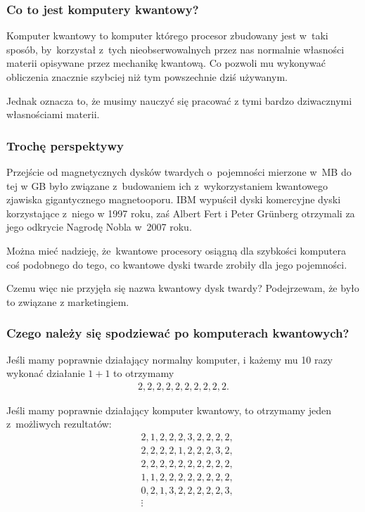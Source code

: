 \documentclass[10pt,t]{beamer}
\begin{document}
\begin{frame}
  \frametitle{Co to jest komputery kwantowy?}


  Komputer kwantowy to komputer którego procesor zbudowany jest w~taki
  sposób, by~korzystał z~tych nieobserwowalnych przez nas normalnie
  własności materii opisywane przez mechanikę kwantową. Co pozwoli mu
  wykonywać obliczenia znacznie szybciej niż tym powszechnie dziś
  używanym.

  Jednak oznacza to, że musimy nauczyć się pracować z tymi bardzo
  dziwacznymi własnościami materii.

\end{frame}





\begin{frame}
  \frametitle{Trochę perspektywy}


  Przejście od magnetycznych dysków twardych o~pojemności mierzone
  w~MB do tej w GB było związane z~budowaniem ich z~wykorzystaniem
  kwantowego zjawiska gigantycznego magnetooporu. IBM wypuścił dyski
  komercyjne dyski korzystające z~niego w 1997 roku, zaś Albert Fert i
  Peter Gr\"{u}nberg otrzymali za jego odkrycie Nagrodę Nobla w~2007
  roku.

  Można mieć nadzieję, że~kwantowe procesory osiągną dla szybkości
  komputera coś podobnego do tego, co kwantowe dyski twarde zrobiły
  dla jego pojemności.

  Czemu więc nie przyjęła się nazwa kwantowy dysk twardy? Podejrzewam,
  że było to związane z marketingiem.

\end{frame}





\begin{frame}
  \frametitle{Czego należy się spodziewać po komputerach kwantowych?}


  Jeśli mamy poprawnie działający normalny komputer, i każemy mu 10
  razy wykonać działanie $1 + 1$ to otrzymamy
  \begin{align*}
    2, 2, 2, 2, 2, 2, 2, 2, 2, 2.
  \end{align*}

  Jeśli mamy poprawnie działający komputer kwantowy, to otrzymamy
  jeden z~możliwych rezultatów:
  \begin{align*}
    &2, 1, 2, 2, 2, 3, 2, 2, 2, 2, \\
    &2, 2, 2, 2, 1, 2, 2, 2, 3, 2, \\
    &2, 2, 2, 2, 2, 2, 2, 2, 2, 2, \\
    &1, 1, 2, 2, 2, 2, 2, 2, 2, 2, \\
    &0, 2, 1, 3, 2, 2, 2, 2, 2, 3, \\
    &\vdots
  \end{align*}

\end{frame}
\end{document}
